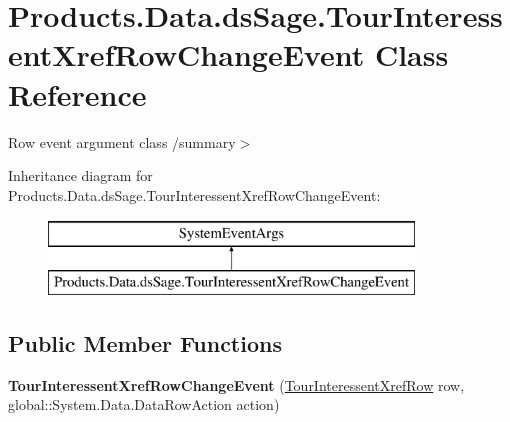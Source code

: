 \hypertarget{class_products_1_1_data_1_1ds_sage_1_1_tour_interessent_xref_row_change_event}{}\section{Products.\+Data.\+ds\+Sage.\+Tour\+Interessent\+Xref\+Row\+Change\+Event Class Reference}
\label{class_products_1_1_data_1_1ds_sage_1_1_tour_interessent_xref_row_change_event}


Row event argument class /summary$>$  


Inheritance diagram for Products.\+Data.\+ds\+Sage.\+Tour\+Interessent\+Xref\+Row\+Change\+Event\+:\begin{figure}[H]
\begin{center}
\leavevmode
\includegraphics[height=2.000000cm]{class_products_1_1_data_1_1ds_sage_1_1_tour_interessent_xref_row_change_event}
\end{center}
\end{figure}
\subsection*{Public Member Functions}
\begin{DoxyCompactItemize}
\item 
{\bfseries Tour\+Interessent\+Xref\+Row\+Change\+Event} (\hyperlink{class_products_1_1_data_1_1ds_sage_1_1_tour_interessent_xref_row}{Tour\+Interessent\+Xref\+Row} row, global\+::\+System.\+Data.\+Data\+Row\+Action action)\hypertarget{class_products_1_1_data_1_1ds_sage_1_1_tour_interessent_xref_row_change_event_a3e0a06153cfb4150b4eeaaef9082ff93}{}\label{class_products_1_1_data_1_1ds_sage_1_1_tour_interessent_xref_row_change_event_a3e0a06153cfb4150b4eeaaef9082ff93}

\end{DoxyCompactItemize}
